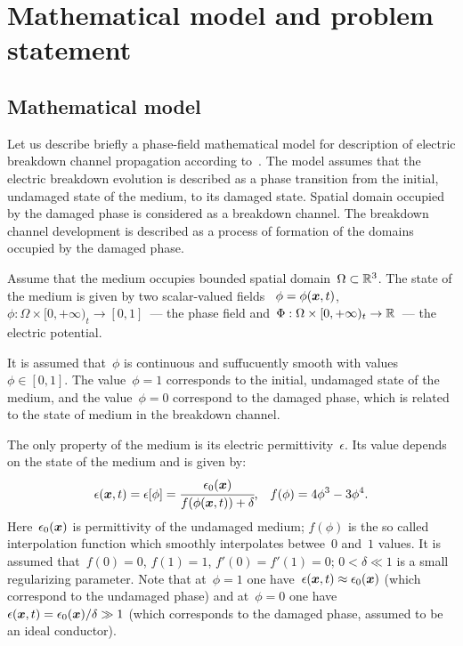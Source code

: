 
\section{Mathematical model and problem statement}

\subsection{Mathematical model}
Let us describe briefly a phase-field mathematical model for
description of electric breakdown channel propagation
according to~\cite{pitike_dielectric_breakdown}.
The model assumes that the electric breakdown evolution
is described as a phase transition from the initial, undamaged state of
the medium, to its damaged state. Spatial domain occupied by the
damaged phase is considered as a breakdown channel.
The breakdown channel development is described as a process of
formation of the domains occupied by the damaged phase.

Assume that the medium occupies bounded spatial domain~$\Omega \subset
{\mathbb{R}}^3$. The state of the medium is given by two scalar-valued fields~
$\phi = \phi({\boldsymbol{x}},t)$, $\phi: \Omega \times [0, +\infty)_t \to [0,
1]$~--- the phase field
and~$\Phi: \Omega \times [0, +\infty)_t \to {\mathbb{R}}$~--- the electric potential.

It is assumed that~$\phi$ is continuous and suffucuently smooth
with values~$\phi\in[0,1]$. The value~$\phi=1$
corresponds to the initial, undamaged state of the medium,
and the value~$\phi=0$ correspond to the damaged phase, which is
related to the state of medium in the breakdown channel.

The only property of the medium is its electric permittivity~$\epsilon$.
Its value depends on the state of the medium and is
given by:
%
\begin{equation}
  \epsilon({\boldsymbol{x}}, t) = \epsilon[\phi] = \cfrac{\epsilon_0({\boldsymbol{x}})}{f(\phi({\boldsymbol{x}}, t)) + \delta} {\text{,}} \quad f(\phi) = 4\phi^3 - 3\phi^4 {\text{.}}
  \label{eq:epsilon}
\end{equation}
Here~$\epsilon_0({\boldsymbol{x}})$ is permittivity of the undamaged medium;
$f(\phi)$ is the so called interpolation function which smoothly
interpolates betwee~$0$ and~$1$ values. It is assumed
that~$f(0) = 0$, $f(1) = 1$, $f'(0) = f'(1) = 0$;
$0 < \delta \ll 1$ is a small regularizing parameter.
Note that at~$\phi = 1$ one have~$\epsilon({\boldsymbol{x}}, t) \approx
\epsilon_0({\boldsymbol{x}})$ (which correspond to the undamaged phase)
and at~$\phi = 0$ one have $\epsilon({\boldsymbol{x}}, t) = \epsilon_0({\boldsymbol{x}}) /\delta \gg 1$
(which corresponds to the damaged phase, assumed to be an ideal conductor).

